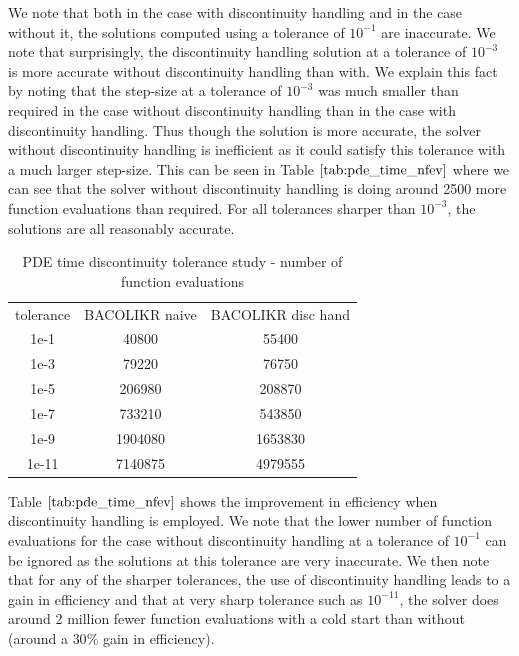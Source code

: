 \documentclass{article}
\begin{document}
We note that both in the case with discontinuity handling and in the case without it, the solutions computed using a tolerance of $10^{-1}$ are inaccurate. We note that surprisingly, the discontinuity handling solution at a tolerance of $10^{-3}$ is more accurate without discontinuity handling than with. We explain this fact by noting that the step-size at a tolerance of $10^{-3}$ was much smaller than required in the case without discontinuity handling than in the case with discontinuity handling. Thus though the solution is more accurate, the solver without discontinuity handling is inefficient as it could satisfy this tolerance with a much larger step-size. This can be seen in Table $\ref{tab:pde_time_nfev}$ where we can see that the solver without discontinuity handling is doing around 2500 more function evaluations than required. For all tolerances sharper than $10^{-3}$, the solutions are all reasonably accurate.

\begin{table}[h]
\caption {PDE time discontinuity tolerance study - number of function evaluations} 
\label{tab:pde_time_nfev}
\begin{center}
\begin{tabular}{ c c c } 
tolerance & BACOLIKR naive  & BACOLIKR disc hand \\ 
1e-1      &   40800         &   55400 \\
1e-3      &   79220         &   76750 \\
1e-5      &  206980         &  208870 \\
1e-7      &  733210         &  543850 \\
1e-9      & 1904080         & 1653830 \\
1e-11     & 7140875         & 4979555 \\
\end{tabular}
\end{center}
\end{table}

Table $\ref{tab:pde_time_nfev}$ shows the improvement in efficiency when discontinuity handling is employed. We note that the lower number of function evaluations for the case without discontinuity handling at a tolerance of $10^{-1}$ can be ignored as the solutions at this tolerance are very inaccurate. We then note that for any of the sharper tolerances, the use of discontinuity handling leads to a gain in efficiency and that at very sharp tolerance such as $10^{-11}$, the solver does around 2 million fewer function evaluations with a cold start than without (around a $30\%$ gain in efficiency). 
\end{document}
